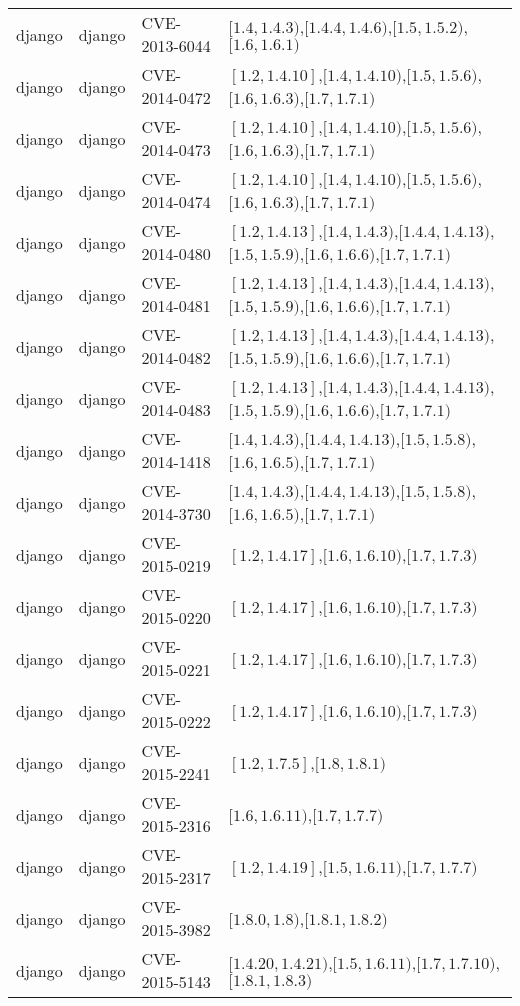 \begin{tabular}{llll}
django & django & CVE-2013-6044 & $[1.4,1.4.3)$,$[1.4.4,1.4.6)$,$[1.5,1.5.2)$,$[1.6,1.6.1)$ \\
django & django & CVE-2014-0472 & $[1.2,1.4.10]$,$[1.4,1.4.10)$,$[1.5,1.5.6)$,$[1.6,1.6.3)$,$[1.7,1.7.1)$ \\
django & django & CVE-2014-0473 & $[1.2,1.4.10]$,$[1.4,1.4.10)$,$[1.5,1.5.6)$,$[1.6,1.6.3)$,$[1.7,1.7.1)$ \\
django & django & CVE-2014-0474 & $[1.2,1.4.10]$,$[1.4,1.4.10)$,$[1.5,1.5.6)$,$[1.6,1.6.3)$,$[1.7,1.7.1)$ \\
django & django & CVE-2014-0480 & $[1.2,1.4.13]$,$[1.4,1.4.3)$,$[1.4.4,1.4.13)$,$[1.5,1.5.9)$,$[1.6,1.6.6)$,$[1.7,1.7.1)$ \\
django & django & CVE-2014-0481 & $[1.2,1.4.13]$,$[1.4,1.4.3)$,$[1.4.4,1.4.13)$,$[1.5,1.5.9)$,$[1.6,1.6.6)$,$[1.7,1.7.1)$ \\
django & django & CVE-2014-0482 & $[1.2,1.4.13]$,$[1.4,1.4.3)$,$[1.4.4,1.4.13)$,$[1.5,1.5.9)$,$[1.6,1.6.6)$,$[1.7,1.7.1)$ \\
django & django & CVE-2014-0483 & $[1.2,1.4.13]$,$[1.4,1.4.3)$,$[1.4.4,1.4.13)$,$[1.5,1.5.9)$,$[1.6,1.6.6)$,$[1.7,1.7.1)$ \\
django & django & CVE-2014-1418 & $[1.4,1.4.3)$,$[1.4.4,1.4.13)$,$[1.5,1.5.8)$,$[1.6,1.6.5)$,$[1.7,1.7.1)$ \\
django & django & CVE-2014-3730 & $[1.4,1.4.3)$,$[1.4.4,1.4.13)$,$[1.5,1.5.8)$,$[1.6,1.6.5)$,$[1.7,1.7.1)$ \\
django & django & CVE-2015-0219 & $[1.2,1.4.17]$,$[1.6,1.6.10)$,$[1.7,1.7.3)$ \\
django & django & CVE-2015-0220 & $[1.2,1.4.17]$,$[1.6,1.6.10)$,$[1.7,1.7.3)$ \\
django & django & CVE-2015-0221 & $[1.2,1.4.17]$,$[1.6,1.6.10)$,$[1.7,1.7.3)$ \\
django & django & CVE-2015-0222 & $[1.2,1.4.17]$,$[1.6,1.6.10)$,$[1.7,1.7.3)$ \\
django & django & CVE-2015-2241 & $[1.2,1.7.5]$,$[1.8,1.8.1)$ \\
django & django & CVE-2015-2316 & $[1.6,1.6.11)$,$[1.7,1.7.7)$ \\
django & django & CVE-2015-2317 & $[1.2,1.4.19]$,$[1.5,1.6.11)$,$[1.7,1.7.7)$ \\
django & django & CVE-2015-3982 & $[1.8.0,1.8)$,$[1.8.1,1.8.2)$ \\
django & django & CVE-2015-5143 & $[1.4.20,1.4.21)$,$[1.5,1.6.11)$,$[1.7,1.7.10)$,$[1.8.1,1.8.3)$ \\

\end{tabular}
